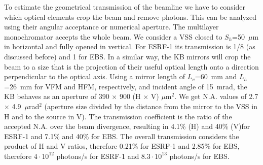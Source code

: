 \documentclass{iucr}              %
\newcommand{\todo}[1]{{\color{red}[TODO: "#1'']}}
\begin{document}
To estimate the geometrical transmission of the beamline we have to consider which optical elements crop the beam and remove photons. This can be analyzed using their angular acceptance or numerical aperture. The multilayer monochromator accepts the whole beam. We consider a VSS closed to $S_h$=50~$\mu$m in horizontal and fully opened in vertical. For ESRF-1 its transmission is 1/8 (as discussed before) and 1 for EBS. In a similar way, the KB mirrors will crop the beam to a size that is the projection of their useful optical length onto a direction perpendicular to the optical axis. Using a mirror length of $L_v$=60~mm and $L_h$=26~mm for VFM and HFM, respectively, and incident angle of 15~mrad, the KB behaves as an aperture of  390 $\times$ 900 (H $\times$ V) $\mu$m$^2$. 
We get N.A. values of 2.7 $\times$ 4.9~$\mu$rad$^2$ (aperture size divided by the distance from the mirror to the VSS in H and to the source in V). The transmission coefficient is the ratio of the accepted N.A. over the beam divergence, resulting in 
4.1\% (H) and 40\% (V)for ESRF-1 and 7.1\% and 40\% for EBS. The overall transmission considers the product of H and V ratios, therefore 
0.21\% for ESRF-1 and 2.85\% for EBS, therefore 
$4\cdot10^{12}$ photons/s for ESRF-1 and $8.3\cdot10^{13}$ photons/s for EBS. 
\end{document}
